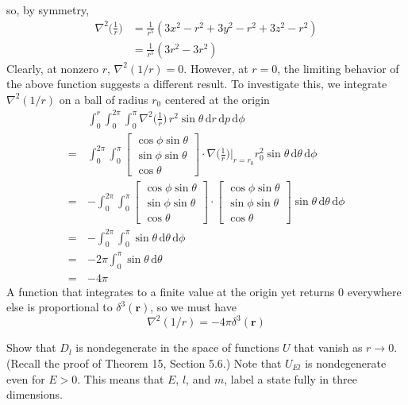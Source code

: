 \documentclass[../principles-of-quantum-mechanics.tex]{subfiles}
\begin{document}
\begin{questions}
\begin{solution}
			so, by symmetry,
			\begin{align*}
				\nabla^2\Big(\frac{1}{r}\Big) &= \frac{1}{r^5}(3x^2 - r^2 + 3y^2 - r^2 + 3z^2 - r^2) \\
				&= \frac{1}{r^5}(3r^2 - 3r^2)
			\end{align*}
			Clearly, at nonzero $r$, $\nabla^2(1/r) = 0$. However, at $r = 0$, the limiting behavior of the above function suggests a different result. To investigate this, we integrate $\nabla^2(1/r)$ on a ball of radius $r_0$ centered at the origin
			\begin{align*}
				&\int_0^r \int_0^{2\pi}\int_0^{\pi}\nabla^2\Big(\frac{1}{r}\Big)\,r^2\sin\theta\,\mathrm{d}r\,\mathrm{d}p\,\mathrm{d}\phi \\
				=\,&\int_0^{2\pi}\int_0^{\pi}\begin{bmatrix}\cos\phi\sin\theta \\ \sin\phi\sin\theta \\ \cos\theta\end{bmatrix}\cdot\nabla\Big(\frac{1}{r}\Big)\Big|_{r=r_0}r_0^2\sin\theta\,\mathrm{d}\theta\,\mathrm{d}\phi \\
				=\,&-\int_0^{2\pi}\int_0^{\pi}\begin{bmatrix}\cos\phi\sin\theta \\ \sin\phi\sin\theta \\ \cos\theta\end{bmatrix}\cdot\begin{bmatrix}\cos\phi\sin\theta \\ \sin\phi\sin\theta \\ \cos\theta\end{bmatrix}\sin\theta\,\mathrm{d}\theta\,\mathrm{d}\phi \\
				=\,&-\int_0^{2\pi}\int_0^{\pi}\sin\theta\,\mathrm{d}\theta\,\mathrm{d}\phi \\
				=\,&{-2\pi}\int_0^\pi\sin\theta\,\mathrm{d}\theta \\
				=\,&{-4\pi}
			\end{align*}
			A function that integrates to a finite value at the origin yet returns $0$ everywhere else is proportional to $\delta^3(\mathbf{r})$, so we must have
			$$\nabla^2(1/r) = -4\pi\delta^3(\mathbf{r})$$
		\end{solution}
	
		\question Show that $D_l$ is nondegenerate in the space of functions $U$ that vanish as $r\to 0$. (Recall the proof of Theorem 15, Section 5.6.) Note that $U_{El}$ is nondegenerate even for $E>0$. This means that $E$, $l$, and $m$, label a state fully in three dimensions.
		

\end{questions}
\end{document}

